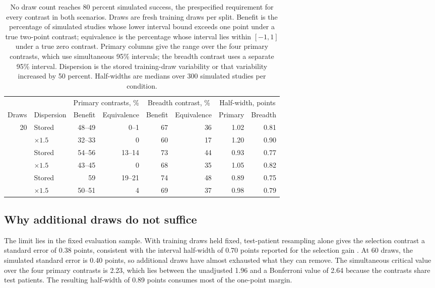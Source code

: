 \begin{table}[htbp]
\centering
\small
\renewcommand{\arraystretch}{1.15}
\begin{tabular}{@{}rlrrrrrr@{}}
\toprule
 & & \multicolumn{2}{c}{Primary contrasts, \%} & \multicolumn{2}{c}{Breadth contrast, \%} & \multicolumn{2}{c}{Half-width, points} \\
\cmidrule(lr){3-4}\cmidrule(lr){5-6}\cmidrule(l){7-8}
Draws & Dispersion & Benefit & Equivalence & Benefit & Equivalence & Primary & Breadth \\
\midrule
20 & Stored & 48--49 & 0--1 & 67 & 36 & 1.02 & 0.81 \\
 & $\times 1.5$ & 32--33 & 0 & 60 & 17 & 1.20 & 0.90 \\
\addlinespace
40 & Stored & 54--56 & 13--14 & 73 & 44 & 0.93 & 0.77 \\
 & $\times 1.5$ & 43--45 & 0 & 68 & 35 & 1.05 & 0.82 \\
\addlinespace
60 & Stored & 59 & 19--21 & 74 & 48 & 0.89 & 0.75 \\
 & $\times 1.5$ & 50--51 & 4 & 69 & 37 & 0.98 & 0.79 \\
\bottomrule
\end{tabular}
\caption{No draw count reaches 80 percent simulated success, the prespecified requirement for every contrast in both scenarios. Draws are fresh training draws per split. Benefit is the percentage of simulated studies whose lower interval bound exceeds one point under a true two-point contrast; equivalence is the percentage whose interval lies within $[-1,1]$ under a true zero contrast. Primary columns give the range over the four primary contrasts, which use simultaneous 95\% intervals; the breadth contrast uses a separate 95\% interval. Dispersion is the stored training-draw variability or that variability increased by 50 percent. Half-widths are medians over 300 simulated studies per condition.}
\label{tab:precision}
\end{table}

\subsection{Why additional draws do not suffice}
\label{sec:precision-floor}
The limit lies in the fixed evaluation sample. With training draws held fixed, test-patient resampling alone gives the selection contrast a standard error of 0.38 points, consistent with the interval half-width of 0.70 points reported for the selection gain \citep{queisler2026shortageSelection}. At 60 draws, the simulated standard error is 0.40 points, so additional draws have almost exhausted what they can remove. The simultaneous critical value over the four primary contrasts is 2.23, which lies between the unadjusted 1.96 and a Bonferroni value of 2.64 because the contrasts share test patients. The resulting half-width of 0.89 points consumes most of the one-point margin.

